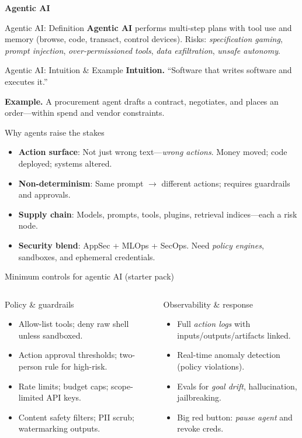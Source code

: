 \documentclass[11pt,aspectratio=169]{beamer}
\newcommand{\Term}[1]{%
  \begin{frame}
    \centering\vfill
    {\usebeamerfont{title}\usebeamercolor[fg]{title}\Huge\textbf{#1}}
    \vfill
  \end{frame}
}
\renewcommand{\Definition}[2]{%
    \begin{frame}{#1: \;Definition}
      \justifying
      #2
    \end{frame}
  }
\newcommand{\Definition}[2]{%
    \begin{frame}{#1: \;Definition}
      \justifying
      #2
    \end{frame}
  }
\newcommand{\Intuition}[3]{%
  \begin{frame}{#1: \;Intuition \& Example}
    \justifying
    \textbf{Intuition.} #2
    \medskip

    \textbf{Example.} #3
  \end{frame}
}
\begin{document}
\Term{Agentic AI}
\Definition{Agentic AI}{\justifying
\textbf{Agentic AI} performs multi-step plans with tool use and memory (browse, code, transact, control devices). Risks: \emph{specification gaming}, \emph{prompt injection}, \emph{over-permissioned tools}, \emph{data exfiltration}, \emph{unsafe autonomy}.}
\Intuition{Agentic AI}{“Software that writes software and executes it.”}{A procurement agent drafts a contract, negotiates, and places an order—within spend and vendor constraints.}

\begin{frame}{Why agents raise the stakes}
\begin{itemize}
  \item \textbf{Action surface}: Not just wrong text—\emph{wrong actions}. Money moved; code deployed; systems altered.
  \item \textbf{Non-determinism}: Same prompt $\rightarrow$ different actions; requires guardrails and approvals.
  \item \textbf{Supply chain}: Models, prompts, tools, plugins, retrieval indices—each a risk node.
  \item \textbf{Security blend}: AppSec + MLOps + SecOps. Need \emph{policy engines}, sandboxes, and ephemeral credentials.
\end{itemize}
\end{frame}

\begin{frame}{Minimum controls for agentic AI (starter pack)}
\begin{columns}[T,onlytextwidth]
\begin{block}{Policy \& guardrails}
\begin{itemize}
  \item Allow-list tools; deny raw shell unless sandboxed.
  \item Action approval thresholds; two-person rule for high-risk.
  \item Rate limits; budget caps; scope-limited API keys.
  \item Content safety filters; PII scrub; watermarking outputs.
\end{itemize}
\end{block}
\begin{block}{Observability \& response}
\begin{itemize}
  \item Full \emph{action logs} with inputs/outputs/artifacts linked.
  \item Real-time anomaly detection (policy violations).
  \item Evals for \emph{goal drift}, hallucination, jailbreaking.
  \item Big red button: \emph{pause agent} and revoke creds.
\end{itemize}
\end{block}
\end{columns}
\end{frame}
\end{document}
